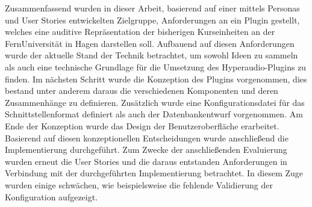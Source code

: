Zusammenfassend wurden in dieser Arbeit, basierend auf einer mittels Personas und User Stories entwickelten Zielgruppe, Anforderungen an ein Plugin gestellt, welches eine auditive Repräsentation der bisherigen Kurseinheiten an der FernUniversität in Hagen darstellen soll. Aufbauend auf diesen Anforderungen wurde der aktuelle Stand der Technik betrachtet, um sowohl Ideen zu sammeln als auch eine technische Grundlage für die Umsetzung des Hyperaudio-Plugins zu finden. Im nächsten Schritt wurde die Konzeption des Plugins vorgenommen, dies bestand unter anderem daraus die verschiedenen Komponenten und deren Zusammenhänge zu definieren. Zusätzlich wurde eine Konfigurationsdatei für das Schnittstellenformat definiert als auch der Datenbankentwurf vorgenommen. Am Ende der Konzeption wurde das Design der Benutzeroberfläche erarbeitet. Basierend auf diesen konzeptionellen Entscheidungen wurde anschließend die Implementierung durchgeführt. Zum Zwecke der anschließenden Evaluierung wurden erneut die User Stories und die daraus entstanden Anforderungen in Verbindung mit der durchgeführten Implementierung betrachtet. In diesem Zuge wurden einige schwächen, wie beispielsweise die fehlende Validierung der Konfiguration aufgezeigt.

